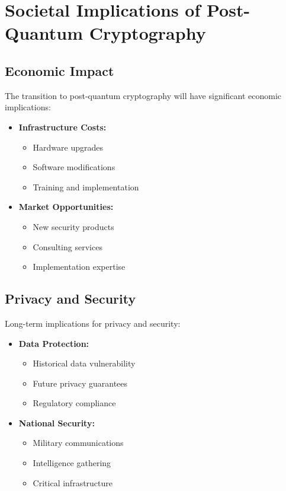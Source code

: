 \chapter{Societal Implications of Post-Quantum Cryptography}\label{chap:societal}

\section{Economic Impact}\label{sec:economic}

The transition to post-quantum cryptography will have significant economic implications:

\begin{itemize}
    \item \textbf{Infrastructure Costs:}
    \begin{itemize}
        \item Hardware upgrades
        \item Software modifications
        \item Training and implementation
    \end{itemize}
    \item \textbf{Market Opportunities:}
    \begin{itemize}
        \item New security products
        \item Consulting services
        \item Implementation expertise
    \end{itemize}
\end{itemize}

\section{Privacy and Security}\label{sec:privacy}

Long-term implications for privacy and security:

\begin{itemize}
    \item \textbf{Data Protection:}
    \begin{itemize}
        \item Historical data vulnerability
        \item Future privacy guarantees
        \item Regulatory compliance
    \end{itemize}
    \item \textbf{National Security:}
    \begin{itemize}
        \item Military communications
        \item Intelligence gathering
        \item Critical infrastructure
    \end{itemize}
\end{itemize}

